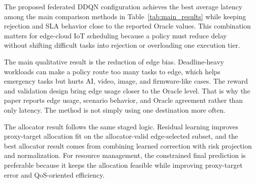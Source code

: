 The proposed federated DDQN configuration achieves the best average latency among the main comparison methods in Table~\ref{tab:main_results} while keeping rejection and SLA behavior close to the reported Oracle values. This combination matters for edge-cloud IoT scheduling because a policy must reduce delay without shifting difficult tasks into rejection or overloading one execution tier.

The main qualitative result is the reduction of edge bias. Deadline-heavy workloads can make a policy route too many tasks to edge, which helps emergency tasks but hurts AI, video, image, and firmware-like cases. The reward and validation design bring edge usage closer to the Oracle level. That is why the paper reports edge usage, scenario behavior, and Oracle agreement rather than only latency. The method is not simply using one destination more often.

The allocator result follows the same staged logic. Residual learning improves proxy-target allocation fit on the allocator-valid edge-selected subset, and the best allocator result comes from combining learned correction with risk projection and normalization. For resource management, the constrained final prediction is preferable because it keeps the allocation feasible while improving proxy-target error and QoS-oriented efficiency.
